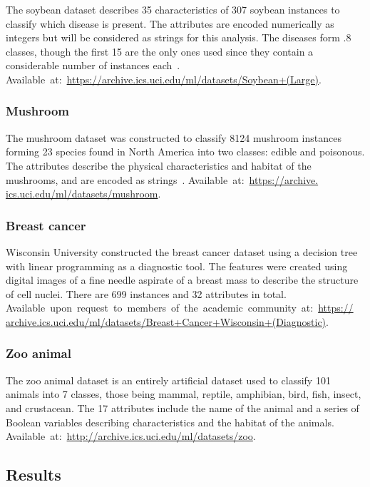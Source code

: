 The soybean dataset describes 35 characteristics of 307 soybean instances to
classify which disease is present. The attributes are encoded numerically as
integers but will be considered as strings for this analysis.
The diseases form .8 classes, though the first 15 are the only ones used since
they contain a considerable number of instances each~\cite{Soybean}. 
Available~at:~\url{https://archive.ics.uci.edu/ml/datasets/Soybean+(Large)}.

\subsubsection*{Mushroom}

The mushroom dataset was constructed to classify 8124 mushroom instances forming
23 species found in North America into two classes: edible and poisonous. The
attributes describe the physical characteristics and habitat of the mushrooms,
and are encoded as strings~\cite{Mushroom}. Available~at:~\url{https://archive.
ics.uci.edu/ml/datasets/mushroom}.

\subsubsection*{Breast cancer}

Wisconsin University constructed the breast cancer dataset using a decision tree
with linear programming as a diagnostic tool. The features were created using
digital images of a fine needle aspirate of a breast mass to describe the
structure of cell nuclei. There are 699 instances and 32 attributes in total.
Available~upon~request~to~members~of~the~academic~community~at:~\url{https://
archive.ics.uci.edu/ml/datasets/Breast+Cancer+Wisconsin+(Diagnostic)}.

\subsubsection*{Zoo animal}

The zoo animal dataset is an entirely artificial dataset used to classify 101
animals into 7 classes, those being mammal, reptile, amphibian, bird, fish,
insect, and crustacean. The 17 attributes include the name of the animal and a
series of Boolean variables describing characteristics and the habitat of the
animals. Available~at:~\url{http://archive.ics.uci.edu/ml/datasets/zoo}.

\subsection{Results}\label{subsec:results}

